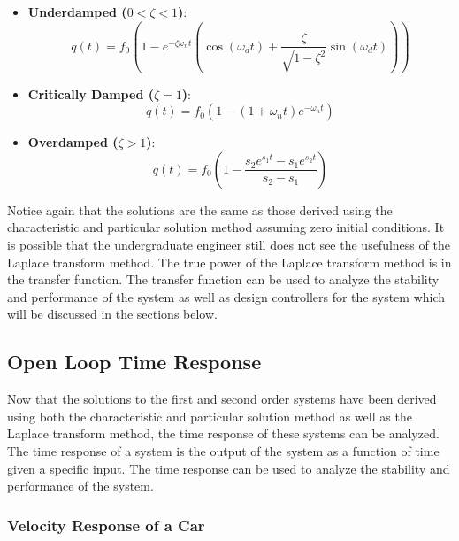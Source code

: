 \begin{itemize}
    \item {\bf Underdamped ($0<\zeta<1$)}:
    \begin{equation}
        q(t) = f_0 \left( 1 - e^{-\zeta \omega_n t} \left( \cos(\omega_d t) + \frac{\zeta}{\sqrt{1-\zeta^2}} \sin(\omega_d t) \right) \right)
    \end{equation}
    \item {\bf Critically Damped ($\zeta=1$)}:
    \begin{equation}
        q(t) = f_0 \left( 1 - (1 + \omega_n t) e^{-\omega_n t} \right)
    \end{equation}
    \item {\bf Overdamped ($\zeta>1$)}:
    \begin{equation}
        q(t) = f_0 \left( 1 - \frac{s_2 e^{s_1 t} - s_1 e^{s_2 t}}{s_2 - s_1} \right)
    \end{equation}
\end{itemize}
Notice again that the solutions are the same as those derived using the characteristic and particular solution method assuming zero initial conditions. It is possible that the undergraduate engineer still does not see the usefulness of the Laplace transform method. The true power of the Laplace transform method is in the transfer function. The transfer function can be used to analyze the stability and performance of the system as well as design controllers for the system which will be discussed in the sections below.

\subsection{Open Loop Time Response}

Now that the solutions to the first and second order systems have been derived using both the characteristic and particular solution method as well as the Laplace transform method, the time response of these systems can be analyzed. The time response of a system is the output of the system as a function of time given a specific input. The time response can be used to analyze the stability and performance of the system. 

\subsubsection{Velocity Response of a Car}

